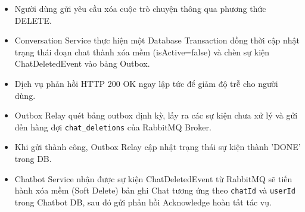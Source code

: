 \begin{itemize}
\item Người dùng gửi yêu cầu xóa cuộc trò chuyện thông qua phương thức DELETE.
\item Conversation Service thực hiện một Database Transaction đồng thời cập nhật trạng thái đoạn chat thành xóa mềm (isActive=false) và chèn sự kiện ChatDeletedEvent vào bảng Outbox.
\item Dịch vụ phản hồi HTTP 200 OK ngay lập tức để giảm độ trễ cho người dùng.
\item Outbox Relay quét bảng outbox định kỳ, lấy ra các sự kiện chưa xử lý và gửi đến hàng đợi \texttt{chat\_deletions} của RabbitMQ Broker.
\item Khi gửi thành công, Outbox Relay cập nhật trạng thái sự kiện thành 'DONE' trong DB.
\item Chatbot Service nhận được sự kiện ChatDeletedEvent từ RabbitMQ sẽ tiến hành xóa mềm (Soft Delete) bản ghi Chat tương ứng theo \texttt{chatId} và \texttt{userId} trong Chatbot DB, sau đó gửi phản hồi Acknowledge hoàn tất tác vụ.
\end{itemize}
